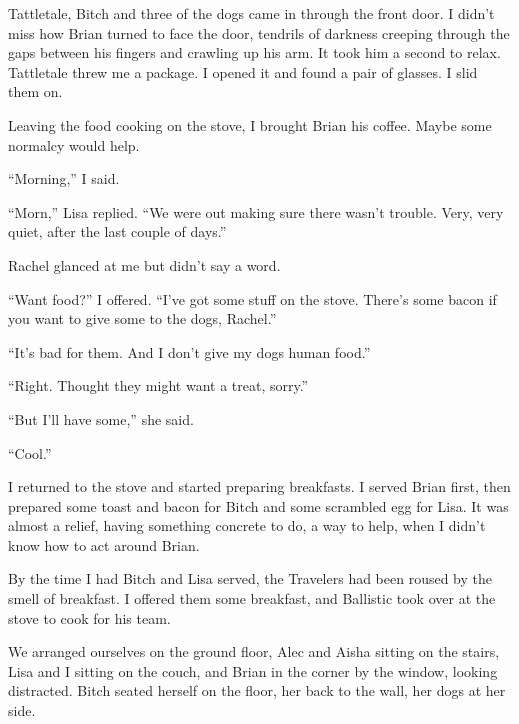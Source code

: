 Tattletale, Bitch and three of the dogs came in through the front door.  I didn't miss how Brian turned to face the door, tendrils of darkness creeping through the gaps between his fingers and crawling up his arm.  It took him a second to relax.  Tattletale threw me a package.  I opened it and found a pair of glasses.  I slid them on.



Leaving the food cooking on the stove, I brought Brian his coffee.  Maybe some normalcy would help.



``Morning,'' I said.



``Morn,'' Lisa replied.  ``We were out making sure there wasn't trouble.  Very, very quiet, after the last couple of days.''



Rachel glanced at me but didn't say a word.



``Want food?''  I offered.  ``I've got some stuff on the stove.  There's some bacon if you want to give some to the dogs, Rachel.''



``It's bad for them.  And I don't give my dogs human food.''



``Right.  Thought they might want a treat, sorry.''



``But I'll have some,'' she said.



``Cool.''



I returned to the stove and started preparing breakfasts.  I served Brian first, then prepared some toast and bacon for Bitch and some scrambled egg for Lisa.  It was almost a relief, having something concrete to do, a way to help, when I didn't know how to act around Brian.



By the time I had Bitch and Lisa served, the Travelers had been roused by the smell of breakfast.  I offered them some breakfast, and Ballistic took over at the stove to cook for his team.



We arranged ourselves on the ground floor, Alec and Aisha sitting on the stairs, Lisa and I sitting on the couch, and Brian in the corner by the window, looking distracted.  Bitch seated herself on the floor, her back to the wall, her dogs at her side.



